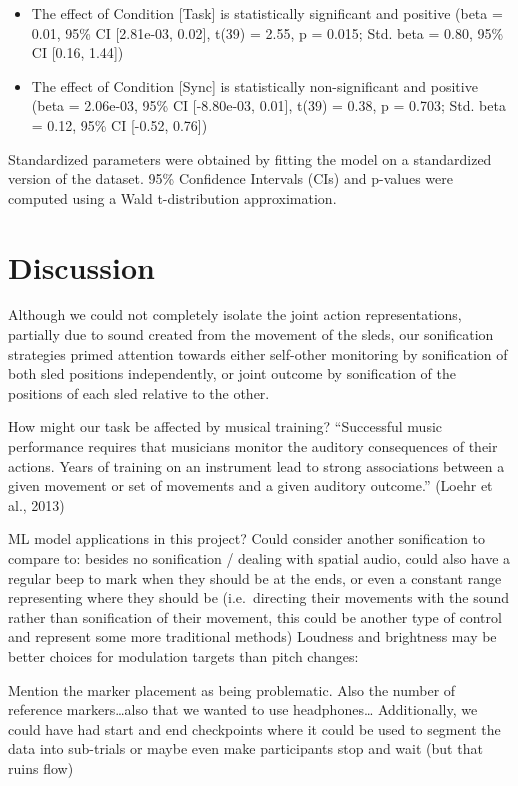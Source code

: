 \documentclass[10pt,a4paper,onecolumn]{article}
\providecommand{\tightlist}{%
  \setlength{\itemsep}{0pt}\setlength{\parskip}{0pt}}
\begin{document}
\begin{itemize}
\tightlist
\item
  The effect of Condition {[}Task{]} is statistically significant and positive (beta = 0.01, 95\% CI {[}2.81e-03, 0.02{]}, t(39) = 2.55, p = 0.015; Std. beta = 0.80, 95\% CI {[}0.16, 1.44{]})
\item
  The effect of Condition {[}Sync{]} is statistically non-significant and positive (beta = 2.06e-03, 95\% CI {[}-8.80e-03, 0.01{]}, t(39) = 0.38, p = 0.703; Std. beta = 0.12, 95\% CI {[}-0.52, 0.76{]})
\end{itemize}

Standardized parameters were obtained by fitting the model on a standardized version of the dataset. 95\% Confidence Intervals (CIs) and p-values were computed using a Wald t-distribution approximation.

\hypertarget{discussion}{%
\section{Discussion}\label{discussion}}

Although we could not completely isolate the joint action representations, partially due to sound created from the movement of the sleds, our sonification strategies primed attention towards either self-other monitoring by sonification of both sled positions independently, or joint outcome by sonification of the positions of each sled relative to the other.

How might our task be affected by musical training? ``Successful music performance requires that musicians monitor the auditory consequences of their actions. Years of training on an instrument lead to strong associations between a given movement or set of movements and a given auditory outcome.'' (Loehr et al., 2013)

ML model applications in this project?
Could consider another sonification to compare to: besides no sonification / dealing with spatial audio, could also have a regular beep to mark when they should be at the ends, or even a constant range representing where they should be (i.e.~directing their movements with the sound rather than sonification of their movement, this could be another type of control and represent some more traditional methods)
Loudness and brightness may be better choices for modulation targets than pitch changes: \autocite{mcdermottMusicalIntervalsRelative2010}

Mention the marker placement as being problematic. Also the number of reference markers\ldots also that we wanted to use headphones\ldots{}
Additionally, we could have had start and end checkpoints where it could be used to segment the data into sub-trials or maybe even make participants stop and wait (but that ruins flow)
\end{document}
